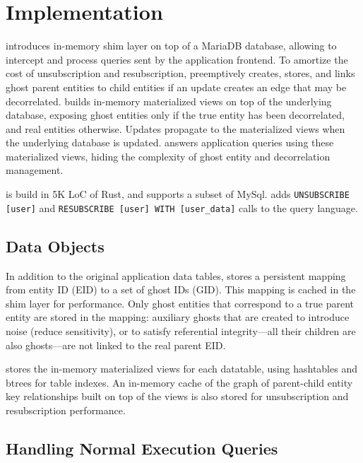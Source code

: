 \section{Implementation}

\sys{} introduces in-memory shim layer on top of a MariaDB database, 
allowing \sys{} to intercept and process queries sent by the application frontend. 
To amortize the cost of unsubscription and resubscription, \sys{} preemptively creates, stores, and
links ghost parent entities to child entities if an update creates an edge that may be decorrelated.
\sys{} builds in-memory materialized views on top of the underlying database, exposing ghost
entities only if the true entity has been decorrelated, and real entities otherwise. Updates
propagate to the materialized views when the underlying database is updated. \sys{} answers
application queries using these materialized views, hiding the complexity of ghost entity and
decorrelation management.

\sys{} is build in 5K LoC of Rust, and supports a subset of MySql. \sys{} adds \texttt{UNSUBSCRIBE
[user]} and \texttt{RESUBSCRIBE [user] WITH [user\_data]} calls to the query language.

\subsection{Data Objects}
In addition to the original application data tables, \sys{} stores a persistent mapping from entity
ID (EID) to a set of ghost IDs (GID). This mapping is cached in the shim layer for performance. Only
ghost entities that correspond to a true parent entity are stored in the mapping: auxiliary ghosts that are
created to introduce noise (reduce sensitivity), or to satisfy referential integrity---all their
children are also ghosts---are not linked to the real parent EID.

\sys{} stores the in-memory materialized views for each datatable, using hashtables and btrees for
table indexes. An in-memory cache of the graph of parent-child entity key relationships built on
top of the views is also stored for unsubscription and resubscription performance.

\subsection{Handling Normal Execution Queries}
